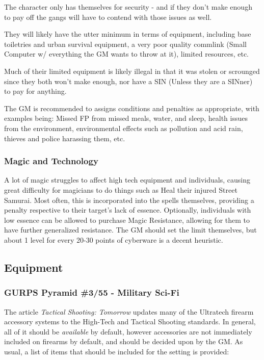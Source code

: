 \begin{multicols*}{2}
	The character only has themselves for security - and if they don't make enough to pay off the gangs will have to contend with those issues as well. 
	
	They will likely have the utter minimum in terms of equipment, including base toiletries and urban survival equipment, a very poor quality commlink (Small Computer w/ everything the GM wants to throw at it), limited resources, etc. 
	
	Much of their limited equipment is likely illegal in that it was stolen or scrounged since they both won't make enough, nor have a SIN (Unless they are a SINner) to pay for anything.
	
	The GM is recommended to assigns conditions and penalties as appropriate, with examples being: Missed FP from missed meals, water, and sleep, health issues from the environment, environmental effects such as pollution and acid rain, thieves and police harassing them, etc. \\
	
	\subsubsection{Magic and Technology}
	
	A lot of magic struggles to affect high tech equipment and individuals, causing great difficulty for magicians to do things such as Heal their injured Street Samurai. Most often, this is incorporated into the spells themselves, providing a penalty respective to their target's lack of essence. Optionally, individuals with low essence can be allowed to purchase Magic Resistance, allowing for them to have further generalized resistance. The GM should set the limit themselves, but about 1 level for every 20-30 points of cyberware is a decent heuristic.
	
	\subsection{Equipment}\label{setting_equipment}
	
	\subsubsection{GURPS Pyramid \#3/55 - Military Sci-Fi}\label{3/55}
	
	The article \textit{Tactical Shooting: Tomorrow} updates many of the Ultratech firearm accessory systems to the High-Tech and Tactical Shooting standards. In general, all of it should be \textit{available} by default, however accessories are not immediately included on firearms by default, and should be decided upon by the GM. As usual, a list of items that should be included for the setting is provided:
	

\end{multicols*}
